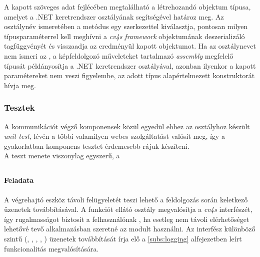 A kapott szöveges adat fejlécében megtalálható a létrehozandó objektum típusa, amelyet a .NET keretrendszer  osztályának segítségével határoz meg. Az osztálynév ismeretében a  metódus egy  szerkezettel kiválasztja, pontosan milyen típusparaméterrel kell meghívni a \emph{cv4s framework}  objektumának deszerializáló tagfüggvényét és visszaadja az eredményül kapott objektumot. Ha az osztálynevet nem ismeri az , a képfeldolgozó műveleteket tartalmazó \emph{assembly} megfelelő típusát példányosítja a .NET keretrendszer  osztályával, azonban ilyenkor a kapott paramétereket nem veszi figyelembe, az adott  típus alapértelmezett konstruktorát hívja meg.

\subsubsection{Tesztek}

A kommunikációt végző komponensek közül egyedül ehhez az osztályhoz készült \emph{unit test}, lévén a többi valamilyen webes szolgáltatást valósít meg, így a gyakorlatban komponens tesztet érdemesebb rájuk készíteni.\\
A teszt menete viszonylag egyszerű, a  

\subsection{} \label{subs:rpi_log_service}
\paragraph{Feladata} A végrehajtó eszköz távoli felügyeletét teszi lehető a feldolgozás során keletkező üzenetek továbbításával. A funkciót ellátó osztály megvalósítja a \emph{cv4s}  interfészét, így rugalmasságot biztosít a felhasználónak , ha esetleg nem távoli elérhetőséget lehetővé tevő alkalmazásban szeretné az  modult használni. Az interfész különböző szintű (, , , , ) üzenetek továbbítását írja elő a \ref{subs:logging} alfejezetben leírt funkcionalitás megvalósítására.
